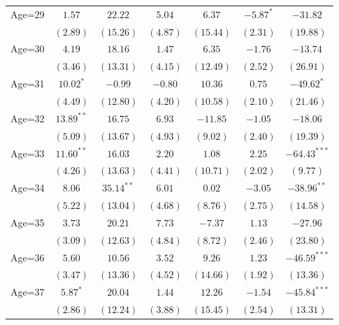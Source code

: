 \documentclass[fullpage]{paper}
\begin{document}
\begin{center}
\begin{longtable}{l c c c c c c }
Age=29      & $1.57$        & $22.22$      & $5.04$       & $6.37$        & $-5.87^{*}$   & $-31.82$       \\
            & $(2.89)$      & $(15.26)$    & $(4.87)$     & $(15.44)$     & $(2.31)$      & $(19.88)$      \\
Age=30      & $4.19$        & $18.16$      & $1.47$       & $6.35$        & $-1.76$       & $-13.74$       \\
            & $(3.46)$      & $(13.31)$    & $(4.15)$     & $(12.49)$     & $(2.52)$      & $(26.91)$      \\
Age=31      & $10.02^{*}$   & $-0.99$      & $-0.80$      & $10.36$       & $0.75$        & $-49.62^{*}$   \\
            & $(4.49)$      & $(12.80)$    & $(4.20)$     & $(10.58)$     & $(2.10)$      & $(21.46)$      \\
Age=32      & $13.89^{**}$  & $16.75$      & $6.93$       & $-11.85$      & $-1.05$       & $-18.06$       \\
            & $(5.09)$      & $(13.67)$    & $(4.93)$     & $(9.02)$      & $(2.40)$      & $(19.39)$      \\
Age=33      & $11.60^{**}$  & $16.03$      & $2.20$       & $1.08$        & $2.25$        & $-64.43^{***}$ \\
            & $(4.26)$      & $(13.63)$    & $(4.41)$     & $(10.71)$     & $(2.02)$      & $(9.77)$       \\
Age=34      & $8.06$        & $35.14^{**}$ & $6.01$       & $0.02$        & $-3.05$       & $-38.96^{**}$  \\
            & $(5.22)$      & $(13.04)$    & $(4.68)$     & $(8.76)$      & $(2.75)$      & $(14.58)$      \\
Age=35      & $3.73$        & $20.21$      & $7.73$       & $-7.37$       & $1.13$        & $-27.96$       \\
            & $(3.09)$      & $(12.63)$    & $(4.84)$     & $(8.72)$      & $(2.46)$      & $(23.80)$      \\
Age=36      & $5.60$        & $10.56$      & $3.52$       & $9.26$        & $1.23$        & $-46.59^{***}$ \\
            & $(3.47)$      & $(13.36)$    & $(4.52)$     & $(14.66)$     & $(1.92)$      & $(13.36)$      \\
Age=37      & $5.87^{*}$    & $20.04$      & $1.44$       & $12.26$       & $-1.54$       & $-45.84^{***}$ \\
            & $(2.86)$      & $(12.24)$    & $(3.88)$     & $(15.45)$     & $(2.54)$      & $(13.31)$      \\

\end{longtable}
\end{center}
\end{document}
